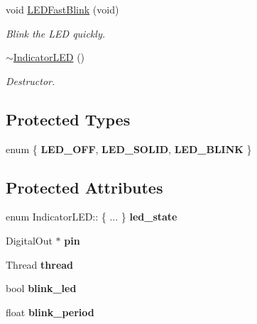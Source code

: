 \begin{DoxyCompactItemize}
\mbox{\label{classIndicatorLED_ac566d7708a4b46cd1abe853f320defb0}} 
void \hyperlink{classIndicatorLED_ac566d7708a4b46cd1abe853f320defb0}{L\+E\+D\+Fast\+Blink} (void)
\begin{DoxyCompactList}\small\item\em Blink the L\+ED quickly. \end{DoxyCompactList}\item 
\mbox{\label{classIndicatorLED_ac97893513aa6527e43e86adcd58b2b2d}} 
\hyperlink{classIndicatorLED_ac97893513aa6527e43e86adcd58b2b2d}{$\sim$\+Indicator\+L\+ED} ()
\begin{DoxyCompactList}\small\item\em Destructor. \end{DoxyCompactList}\end{DoxyCompactItemize}
\subsection*{Protected Types}
\begin{DoxyCompactItemize}
\item 
\mbox{\label{classIndicatorLED_a9fd9aa6dc16304ee02868ec3e5bb21ee}} 
enum \{ {\bfseries L\+E\+D\+\_\+\+O\+FF}, 
{\bfseries L\+E\+D\+\_\+\+S\+O\+L\+ID}, 
{\bfseries L\+E\+D\+\_\+\+B\+L\+I\+NK}
 \}
\end{DoxyCompactItemize}
\subsection*{Protected Attributes}
\begin{DoxyCompactItemize}
\item 
\mbox{\label{classIndicatorLED_a83ecf46edc633a135fb0221edd68987a}} 
enum Indicator\+L\+E\+D\+:: \{ ... \}  {\bfseries led\+\_\+state}
\item 
\mbox{\label{classIndicatorLED_a3a81835df63916bf2412f1f4d976062f}} 
Digital\+Out $\ast$ {\bfseries pin}
\item 
\mbox{\label{classIndicatorLED_ae369c8ca69f2adf6d4477cb08f733f3a}} 
Thread {\bfseries thread}
\item 
\mbox{\label{classIndicatorLED_a11d9a1d0f8545efeeea73e4f7daed1f5}} 
bool {\bfseries blink\+\_\+led}
\item 
\mbox{\label{classIndicatorLED_a742e1af0fb722acd6de7c130177e1027}} 
float {\bfseries blink\+\_\+period}
\end{DoxyCompactItemize}


